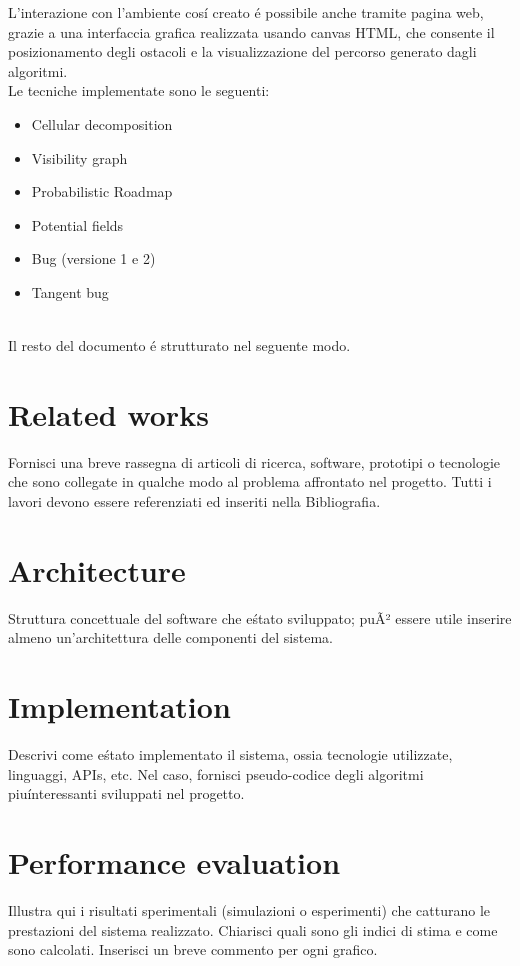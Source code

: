\documentclass[conference]{IEEEtran}
\begin{document}
L'interazione con l'ambiente cos\'i creato \'e possibile anche tramite pagina web, grazie a una
interfaccia grafica realizzata usando canvas HTML, che consente il posizionamento degli ostacoli
e la visualizzazione del percorso generato dagli algoritmi.
\\
Le tecniche implementate sono le seguenti:
\begin{itemize}
\item Cellular decomposition
\item Visibility graph
\item Probabilistic Roadmap
\item Potential fields
\item Bug (versione 1 e 2)
\item Tangent bug \\~\
\end{itemize}

Il resto del documento \'e strutturato nel seguente modo. 


\section{Related works}
Fornisci una breve rassegna di articoli di ricerca, software, prototipi o tecnologie che sono collegate in qualche modo al problema affrontato nel progetto. Tutti i lavori devono essere referenziati ed inseriti nella Bibliografia.

\section{Architecture}
Struttura concettuale del software che e\' stato sviluppato; puÃ² essere utile inserire almeno un'architettura delle componenti del sistema.

\section{Implementation}
Descrivi come e\' stato implementato il sistema, ossia tecnologie utilizzate, linguaggi, APIs, etc. Nel caso, fornisci pseudo-codice degli algoritmi
piu\' interessanti sviluppati nel progetto.

\section{Performance evaluation}
Illustra qui i risultati sperimentali (simulazioni o esperimenti) che catturano le prestazioni del sistema realizzato. Chiarisci quali sono gli indici di stima
e come sono calcolati. Inserisci un breve commento per ogni grafico.
\end{document}

